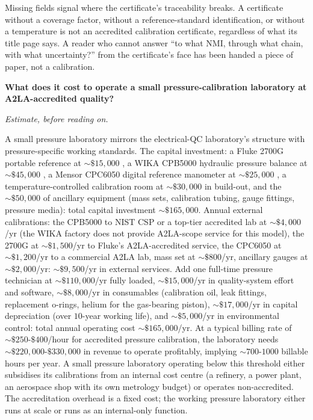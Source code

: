 Missing fields signal where the certificate's traceability
breaks. A certificate without a coverage factor, without a
reference-standard identification, or without a temperature is
not an accredited calibration certificate, regardless of what
its title page says. A reader who cannot answer ``to what NMI,
through what chain, with what uncertainty?'' from the
certificate's face has been handed a piece of paper, not a
calibration.

\begin{estimation}
\textbf{What does it cost to operate a small pressure-calibration
laboratory at A2LA-accredited quality?}

\smallskip
\textit{Estimate, before reading on.}

\smallskip
A small pressure laboratory mirrors the electrical-QC laboratory's
structure with pressure-specific working standards. The capital
investment: a Fluke 2700G portable reference at
$\sim\$15{,}000$ \cite{web:ch03t3b-fluke-2700g}, a WIKA CPB5000
hydraulic pressure balance at $\sim\$45{,}000$
\cite{web:ch03t3b-wika-cpb5000}, a Mensor CPC6050 digital
reference manometer at $\sim\$25{,}000$
\cite{web:ch03t3b-mensor-cpc6050}, a temperature-controlled
calibration room at $\sim\$30{,}000$ in build-out, and the
$\sim\$50{,}000$ of ancillary equipment (mass sets, calibration
tubing, gauge fittings, pressure media): total capital
investment $\sim\$165{,}000$. Annual external calibrations: the
CPB5000 to NIST CSP or a top-tier accredited lab at
$\sim\$4{,}000$/yr (the WIKA factory does not provide A2LA-scope
service for this model), the 2700G at $\sim\$1{,}500$/yr to
Fluke's A2LA-accredited service, the CPC6050 at $\sim\$1{,}200$/yr
to a commercial A2LA lab, mass set at $\sim\$800$/yr, ancillary
gauges at $\sim\$2{,}000$/yr: $\sim\$9{,}500$/yr in external
services. Add one full-time pressure technician at
$\sim\$110{,}000$/yr fully loaded, $\sim\$15{,}000$/yr in
quality-system effort and software, $\sim\$8{,}000$/yr in
consumables (calibration oil, leak fittings, replacement
o-rings, helium for the gas-bearing piston), $\sim\$17{,}000$/yr
in capital depreciation (over $10$-year working life), and
$\sim\$5{,}000$/yr in environmental control: total annual
operating cost $\sim\$165{,}000$/yr. At a typical billing rate of
$\sim\$250$-$\$400$/hour for accredited pressure calibration, the
laboratory needs $\sim\$220{,}000$-$\$330{,}000$ in revenue to
operate profitably, implying $\sim 700$-$1000$ billable hours per
year. A small pressure laboratory operating below this threshold
either subsidises its calibrations from an internal cost centre
(a refinery, a power plant, an aerospace shop with its own
metrology budget) or operates non-accredited. The accreditation
overhead is a fixed cost; the working pressure laboratory either
runs at scale or runs as an internal-only function.
\end{estimation}

